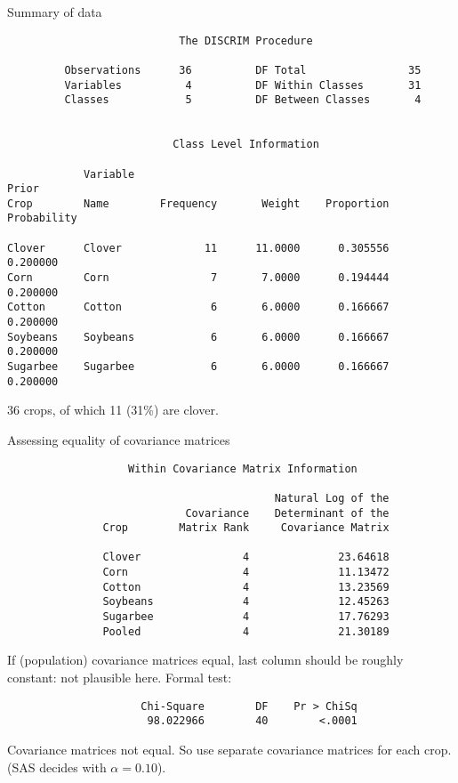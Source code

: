\documentclass[pdf]{prosper}
\begin{document}
\begin{slide}{Summary of data}

{\scriptsize
\begin{verbatim}
                           The DISCRIM Procedure

         Observations      36          DF Total                35
         Variables          4          DF Within Classes       31
         Classes            5          DF Between Classes       4


                          Class Level Information
 
            Variable                                                  Prior
Crop        Name        Frequency       Weight    Proportion    Probability

Clover      Clover             11      11.0000      0.305556       0.200000
Corn        Corn                7       7.0000      0.194444       0.200000
Cotton      Cotton              6       6.0000      0.166667       0.200000
Soybeans    Soybeans            6       6.0000      0.166667       0.200000
Sugarbee    Sugarbee            6       6.0000      0.166667       0.200000

\end{verbatim}
}

36 crops, of which 11 (31\%) are clover.
  
\end{slide}

\begin{slide}{Assessing equality of covariance matrices}

{\scriptsize
\begin{verbatim}
                   Within Covariance Matrix Information
 
                                          Natural Log of the
                            Covariance    Determinant of the
               Crop        Matrix Rank     Covariance Matrix

               Clover                4              23.64618
               Corn                  4              11.13472
               Cotton                4              13.23569
               Soybeans              4              12.45263
               Sugarbee              4              17.76293
               Pooled                4              21.30189
\end{verbatim}
}

If (population) covariance matrices equal, last column should be roughly constant: not plausible here. Formal test:

{\scriptsize
\begin{verbatim}
                     Chi-Square        DF    Pr > ChiSq
                      98.022966        40        <.0001
\end{verbatim}
}

Covariance matrices not equal. So use separate covariance matrices for
each crop. (SAS decides with $\alpha=0.10$).
  
\end{slide}
\end{document}
